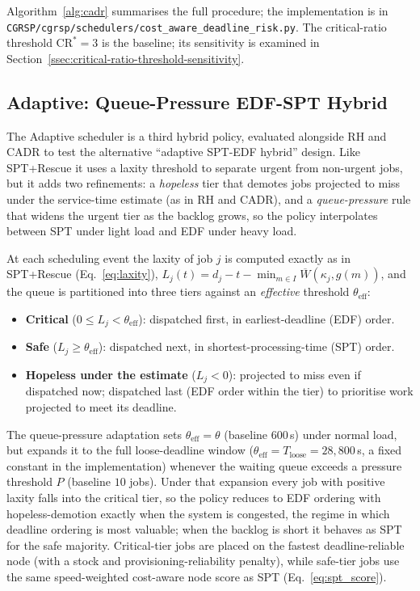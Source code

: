 Algorithm~\ref{alg:cadr} summarises the full procedure; the implementation is in \texttt{CGRSP/\allowbreak cgrsp/\allowbreak schedulers/\allowbreak cost\allowbreak\_aware\allowbreak\_deadline\allowbreak\_risk.py}. The critical-ratio threshold $\mathrm{CR}^*=3$ is the baseline; its sensitivity is examined in Section~\ref{ssec:critical-ratio-threshold-sensitivity}.

\subsection{Adaptive: Queue-Pressure EDF-SPT Hybrid}
\label{ssec:adaptive-queue-pressure-edf-spt-hybrid}

The Adaptive scheduler is a third hybrid policy, evaluated alongside RH and CADR to test the alternative ``adaptive SPT-EDF hybrid'' design. Like SPT+Rescue it uses a laxity threshold to separate urgent from non-urgent jobs, but it adds two refinements: a \emph{hopeless} tier that demotes jobs projected to miss under the service-time estimate (as in RH and CADR), and a \emph{queue-pressure} rule that widens the urgent tier as the backlog grows, so the policy interpolates between SPT under light load and EDF under heavy load.

At each scheduling event the laxity of job $j$ is computed exactly as in SPT+Rescue (Eq.~\ref{eq:laxity}), $L_j(t) = d_j - t - \min_{m \in I} \overline{W}(\kappa_j, g(m))$, and the queue is partitioned into three tiers against an \emph{effective} threshold $\theta_{\text{eff}}$:
\begin{itemize}
  \item \textbf{Critical} ($0 \leq L_j < \theta_{\text{eff}}$): dispatched first, in earliest-deadline (EDF) order.
  \item \textbf{Safe} ($L_j \geq \theta_{\text{eff}}$): dispatched next, in shortest-processing-time (SPT) order.
  \item \textbf{Hopeless under the estimate} ($L_j < 0$): projected to miss even if dispatched now; dispatched last (EDF order within the tier) to prioritise work projected to meet its deadline.
\end{itemize}
The queue-pressure adaptation sets $\theta_{\text{eff}} = \theta$ (baseline $600$\,s) under normal load, but expands it to the full loose-deadline window ($\theta_{\text{eff}} = T_{\text{loose}} = 28{,}800$\,s, a fixed constant in the implementation) whenever the waiting queue exceeds a pressure threshold $P$ (baseline $10$ jobs). Under that expansion every job with positive laxity falls into the critical tier, so the policy reduces to EDF ordering with hopeless-demotion exactly when the system is congested, the regime in which deadline ordering is most valuable; when the backlog is short it behaves as SPT for the safe majority. Critical-tier jobs are placed on the fastest deadline-reliable node (with a stock and provisioning-reliability penalty), while safe-tier jobs use the same speed-weighted cost-aware node score as SPT (Eq.~\ref{eq:spt_score}).

